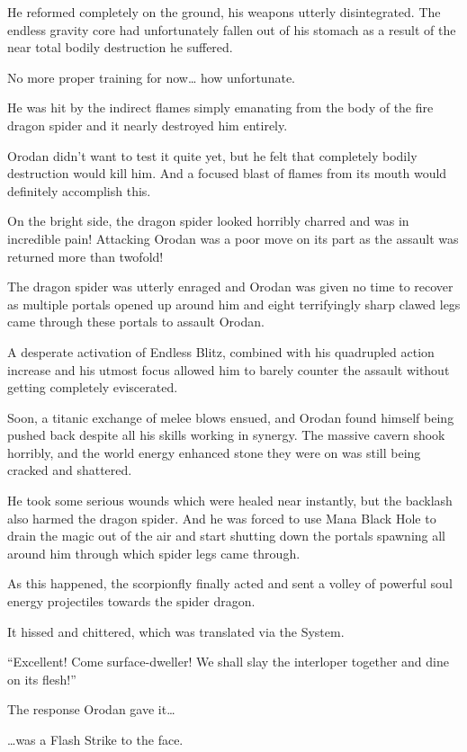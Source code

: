 \documentclass[a4paper,10pt]{book}
\begin{document}
He reformed completely on the ground, his weapons utterly disintegrated. The endless gravity core had unfortunately fallen out of his stomach as a result of the near total bodily destruction he suffered.\par
No more proper training for now… how unfortunate.\par
He was hit by the indirect flames simply emanating from the body of the fire dragon spider and it nearly destroyed him entirely.\par
Orodan didn’t want to test it quite yet, but he felt that completely bodily destruction would kill him. And a focused blast of flames from its mouth would definitely accomplish this.\par
On the bright side, the dragon spider looked horribly charred and was in incredible pain! Attacking Orodan was a poor move on its part as the assault was returned more than twofold!\par
The dragon spider was utterly enraged and Orodan was given no time to recover as multiple portals opened up around him and eight terrifyingly sharp clawed legs came through these portals to assault Orodan.\par
A desperate activation of Endless Blitz, combined with his quadrupled action increase and his utmost focus allowed him to barely counter the assault without getting completely eviscerated.\par
Soon, a titanic exchange of melee blows ensued, and Orodan found himself being pushed back despite all his skills working in synergy. The massive cavern shook horribly, and the world energy enhanced stone they were on was still being cracked and shattered.\par
He took some serious wounds which were healed near instantly, but the backlash also harmed the dragon spider. And he was forced to use Mana Black Hole to drain the magic out of the air and start shutting down the portals spawning all around him through which spider legs came through.\par
As this happened, the scorpionfly finally acted and sent a volley of powerful soul energy projectiles towards the spider dragon.\par
It hissed and chittered, which was translated via the System.\par
“Excellent! Come surface-dweller! We shall slay the interloper together and dine on its flesh!”\par
The response Orodan gave it…\par
…was a Flash Strike to the face.\par
\end{document}
